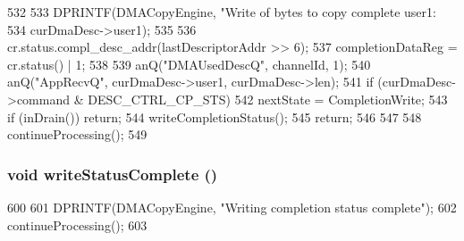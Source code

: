 \begin{DoxyCode}
532 {
533     DPRINTF(DMACopyEngine, "Write of bytes to copy complete user1: %
534             curDmaDesc->user1);
535 
536     cr.status.compl_desc_addr(lastDescriptorAddr >> 6);
537     completionDataReg = cr.status() | 1;
538 
539     anQ("DMAUsedDescQ", channelId, 1);
540     anQ("AppRecvQ", curDmaDesc->user1, curDmaDesc->len);
541     if (curDmaDesc->command & DESC_CTRL_CP_STS) {
542         nextState = CompletionWrite;
543         if (inDrain()) return;
544         writeCompletionStatus();
545         return;
546     }
547 
548     continueProcessing();
549 }
\end{DoxyCode}
\hypertarget{classCopyEngine_1_1CopyEngineChannel_abbbcfb2dd0fad92c68dfda56b4b334b8}{
\subsubsection[{writeStatusComplete}]{\setlength{\rightskip}{0pt plus 5cm}void writeStatusComplete ()}}
\label{classCopyEngine_1_1CopyEngineChannel_abbbcfb2dd0fad92c68dfda56b4b334b8}



\begin{DoxyCode}
600 {
601     DPRINTF(DMACopyEngine, "Writing completion status complete\n");
602     continueProcessing();
603 }
\end{DoxyCode}


